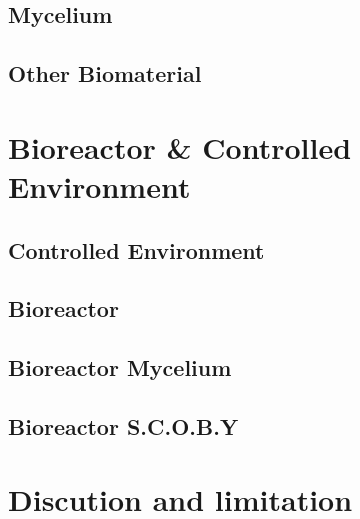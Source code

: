 \subsection{Mycelium}


\subsection{Other Biomaterial}




















\section{Bioreactor \& Controlled Environment }

\subsection{Controlled Environment} 



















\subsection{Bioreactor}
\subsection{Bioreactor Mycelium}
\subsection{Bioreactor S.C.O.B.Y}


\section{Discution and limitation}